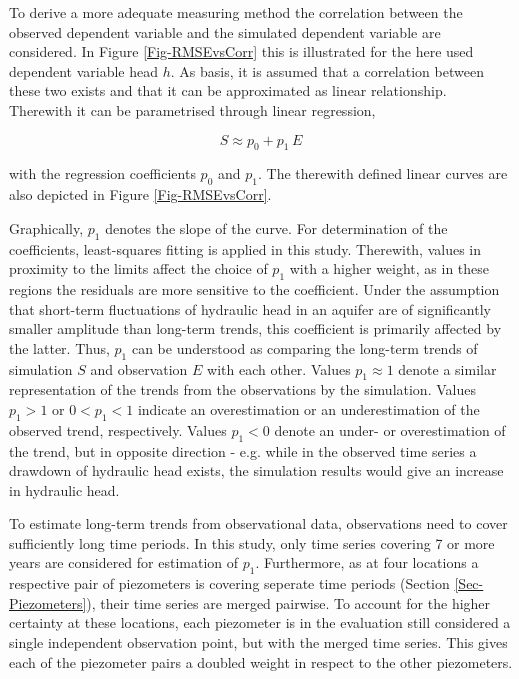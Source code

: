 To derive a more adequate measuring method the correlation between the observed dependent variable and the simulated dependent variable are considered. 
In Figure \ref{Fig-RMSEvsCorr} this is illustrated for the here used dependent variable head $h$. 
As basis, it is assumed that a correlation between these two exists and that it can be approximated as linear relationship. 
Therewith it can be parametrised through linear regression,

\begin{equation}
    \label{Eq-ErrMethLinReg}
    S \approx p_0 + p_1 \, E
\end{equation}

\noindent with the regression coefficients $p_0$ and $p_1$. 
The therewith defined linear curves are also depicted in Figure \ref{Fig-RMSEvsCorr}.

Graphically, $p_1$ denotes the slope of the curve. 
For determination of the coefficients, least-squares fitting is applied in this study. 
Therewith, values in proximity to the limits affect the choice of $p_1$ with a higher weight, as in these regions the residuals are more sensitive to the coefficient. 
Under the assumption that short-term fluctuations of hydraulic head in an aquifer are of significantly smaller amplitude than long-term trends, this coefficient is primarily affected by the latter. 
Thus, $p_1$ can be understood as comparing the long-term trends of simulation $S$ and observation $E$ with each other. 
Values $p_1 \approx 1$ denote a similar representation of the trends from the observations by the simulation. 
Values $p_1 > 1$ or $0 < p_1 < 1$ indicate an overestimation or an underestimation of the observed trend, respectively. 
Values $p_1 < 0$ denote an under- or overestimation of the trend, but in opposite direction - e.g. while in the observed time series a drawdown of hydraulic head exists, the simulation results would give an increase in hydraulic head.


To estimate long-term trends from observational data, observations need to cover sufficiently long time periods. 
In this study, only time series covering 7 or more years are considered for estimation of $p_1$. 
Furthermore, as at four locations a respective pair of piezometers is covering seperate time periods (Section \ref{Sec-Piezometers}), their time series are merged pairwise. 
To account for the higher certainty at these locations, each piezometer is in the evaluation still considered a single independent observation point, but with the merged time series. 
This gives each of the piezometer pairs a doubled weight in respect to the other piezometers.

